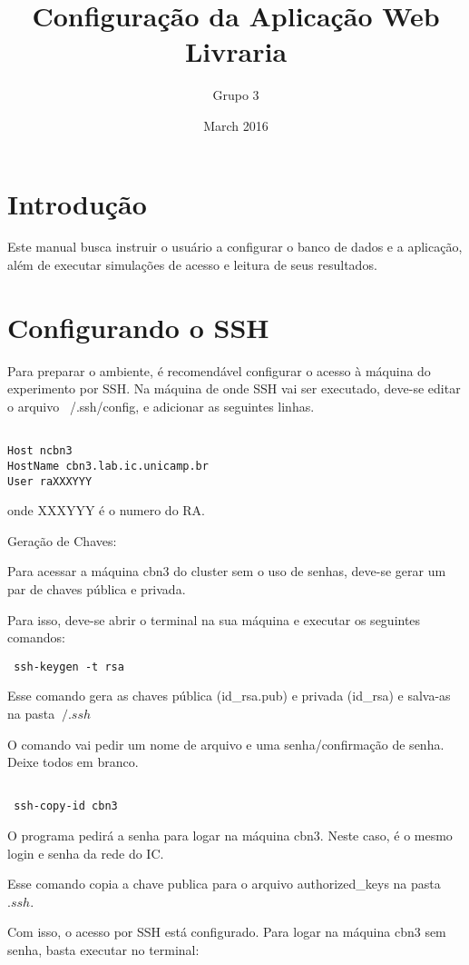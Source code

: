 \documentclass{article}
\title{Configuração da Aplicação Web Livraria}
\author{Grupo 3}
\date{March 2016}
\begin{document}
\maketitle

\section{Introdução}
Este manual busca instruir o usuário a configurar o banco de dados e a aplicação, além de executar simulações de acesso e leitura de seus resultados.

\section{Configurando o SSH}

Para preparar o ambiente, é recomendável configurar o acesso à máquina do experimento por SSH.
Na máquina de onde SSH vai ser executado, deve-se editar o arquivo ~/.ssh/config, e adicionar as seguintes linhas.
\begin{verbatim}
  
Host ncbn3
HostName cbn3.lab.ic.unicamp.br
User raXXXYYY

\end{verbatim}

onde XXXYYY é o numero do RA.

Geração de Chaves:

Para acessar a máquina cbn3 do cluster sem o uso de senhas, deve-se gerar um par de chaves pública e privada.

Para isso, deve-se abrir o terminal na sua máquina e executar os seguintes comandos:
\begin{verbatim}
 ssh-keygen -t rsa
\end{verbatim}

Esse comando gera as chaves pública (id_rsa.pub) e privada (id_rsa) e salva-as na pasta $ ~/.ssh$

O comando vai pedir um nome de arquivo e uma senha/confirmação de senha. Deixe todos em branco.
\begin{verbatim}

 ssh-copy-id cbn3
\end{verbatim}

O programa pedirá a senha para logar na máquina cbn3. Neste caso, é o mesmo login e senha da rede do IC.

Esse comando copia a chave publica para o arquivo authorized_keys na pasta $.ssh$.

Com isso, o acesso por SSH está configurado. Para logar na máquina cbn3 sem senha, basta executar no terminal:
\end{document}
